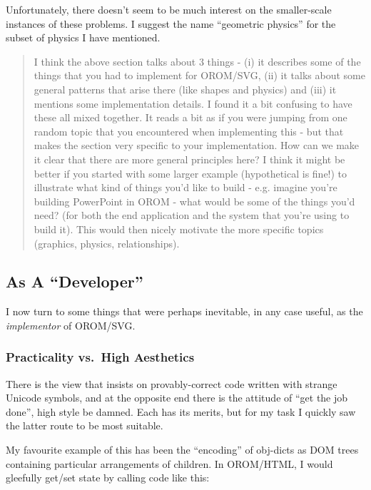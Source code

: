 \documentclass[english,submission]{programming}
\begin{document}
  Unfortunately, there doesn't seem to be much interest on the
  smaller-scale instances of these problems. I suggest the name
  ``geometric physics'' for the subset of physics I have mentioned.

  \begin{quote}
  I think the above section talks about 3 things - (i) it describes some
  of the things that you had to implement for OROM/SVG, (ii) it talks
  about some general patterns that arise there (like shapes and physics)
  and (iii) it mentions some implementation details. I found it a bit
  confusing to have these all mixed together. It reads a bit as if you
  were jumping from one random topic that you encountered when
  implementing this - but that makes the section very specific to your
  implementation. How can we make it clear that there are more general
  principles here? I think it might be better if you started with some
  larger example (hypothetical is fine!) to illustrate what kind of things
  you'd like to build - e.g. imagine you're building PowerPoint in OROM -
  what would be some of the things you'd need? (for both the end
  application and the system that you're using to build it). This would
  then nicely motivate the more specific topics (graphics, physics,
  relationships).
  \end{quote}

  \hypertarget{as-a-developer}{%
  \subsection{As A ``Developer''}\label{as-a-developer}}

  I now turn to some things that were perhaps inevitable, in any case
  useful, as the \emph{implementor} of OROM/SVG.

  \hypertarget{practicality-vs.-high-aesthetics}{%
  \subsubsection{Practicality vs.~High
  Aesthetics}\label{practicality-vs.-high-aesthetics}}

  There is the view that insists on provably-correct code written with
  strange Unicode symbols, and at the opposite end there is the attitude
  of ``get the job done'', high style be damned. Each has its merits, but
  for my task I quickly saw the latter route to be most suitable.

  My favourite example of this has been the ``encoding'' of obj-dicts as
  DOM trees containing particular arrangements of children. In OROM/HTML,
  I would gleefully get/set state by calling code like this:
\end{document}
